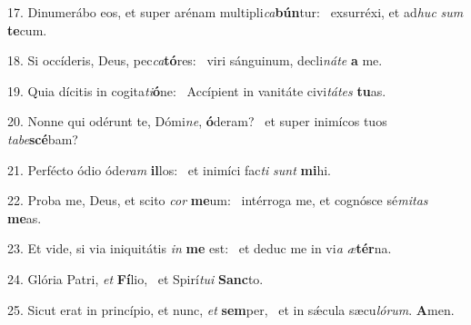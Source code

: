 17. Dinumerábo eos, et super arénam multipli\textit{ca}\textbf{bún}tur: \ast\  exsurréxi, et ad\textit{huc} \textit{sum} \textbf{te}cum.\

18. Si occíderis, Deus, pec\textit{ca}\textbf{tó}res: \ast\  viri sánguinum, decli\textit{ná}\textit{te} \textbf{a} me.\

19. Quia dícitis in cogita\textit{ti}\textbf{ó}ne: \ast\  Accípient in vanitáte civi\textit{tá}\textit{tes} \textbf{tu}as.\

20. Nonne qui odérunt te, Dómi\textit{ne}, \textbf{ó}deram? \ast\  et super inimícos tuos \textit{ta}\textit{be}\textbf{scé}bam?\

21. Perfécto ódio óde\textit{ram} \textbf{il}los: \ast\  et inimíci fac\textit{ti} \textit{sunt} \textbf{mi}hi.\

22. Proba me, Deus, et scito \textit{cor} \textbf{me}um: \ast\  intérroga me, et cognósce sé\textit{mi}\textit{tas} \textbf{me}as.\

23. Et vide, si via iniquitátis \textit{in} \textbf{me} est: \ast\  et deduc me in vi\textit{a} \textit{æ}\textbf{tér}na.\

24. Glória Patri, \textit{et} \textbf{Fí}lio, \ast\  et Spirí\textit{tu}\textit{i} \textbf{Sanc}to.\

25. Sicut erat in princípio, et nunc, \textit{et} \textbf{sem}per, \ast\  et in sǽcula sæcu\textit{ló}\textit{rum}. \textbf{A}men.\

